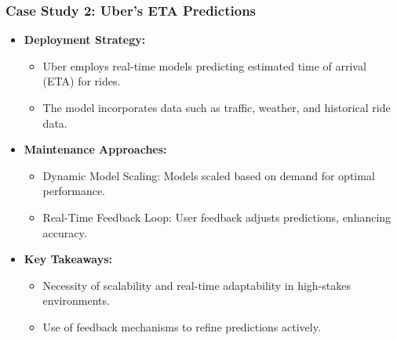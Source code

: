 \documentclass[aspectratio=169]{beamer}
\begin{document}
\begin{frame}[fragile]
    \frametitle{Case Study 2: Uber's ETA Predictions}
    \begin{itemize}
        \item \textbf{Deployment Strategy:}
            \begin{itemize}
                \item Uber employs real-time models predicting estimated time of arrival (ETA) for rides.
                \item The model incorporates data such as traffic, weather, and historical ride data.
            \end{itemize}
        \item \textbf{Maintenance Approaches:}
            \begin{itemize}
                \item Dynamic Model Scaling: Models scaled based on demand for optimal performance.
                \item Real-Time Feedback Loop: User feedback adjusts predictions, enhancing accuracy.
            \end{itemize}
        \item \textbf{Key Takeaways:}
            \begin{itemize}
                \item Necessity of scalability and real-time adaptability in high-stakes environments.
                \item Use of feedback mechanisms to refine predictions actively.
            \end{itemize}
    \end{itemize}
\end{frame}
\end{document}
